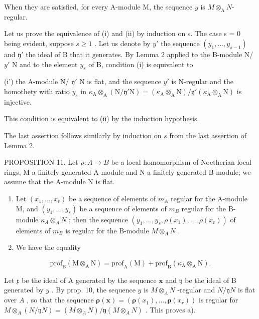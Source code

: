 When they are satisfied, for every A-module M, the sequence \(y\) is \(M\otimes_{\mathrm{A}}N\)-regular.

Let us prove the equivalence of (i) and (ii) by induction on s. The case s = 0 being evident, suppose \(s \geqslant 1\) . Let us denote by \(y'\) the sequence \((y_{1}, \ldots, y_{s-1})\) and \(\mathfrak{y}'\) the ideal of B that it generates. By Lemma 2 applied to the B-module N/ \(y'\) N and to the element \(y_{s}\) of B, condition (i) is equivalent to

(i') the A-module N/ \(\mathfrak{y}'\) N is flat, and the sequence \(y'\) is N-regular and the homothety with ratio \(y_s\) in \(\kappa_{\mathrm{A}} \otimes_{\mathrm{A}} (\mathrm{N}/\mathfrak{y}'\mathrm{N}) = (\kappa_{\mathrm{A}} \otimes_{\mathrm{A}} \mathrm{N})/\mathfrak{y}'(\kappa_{\mathrm{A}} \otimes_{\mathrm{A}} \mathrm{N})\) is injective.

This condition is equivalent to (ii) by the induction hypothesis.

The last assertion follows similarly by induction on \(s\) from the last assertion of Lemma 2.

PROPOSITION 11. Let \(\rho: A \to B\) be a local homomorphism of Noetherian local rings, M a finitely generated A-module and N a finitely generated B-module; we assume that the A-module N is flat.

\begin{enumerate}
\def\labelenumi{\alph{enumi})}
\item
  Let \((x_{1},\ldots,x_{r})\) be a sequence of elements of \(m_{A}\) regular for the A-module M, and \((y_{1},\ldots,y_{s})\) be a sequence of elements of \(m_{B}\) regular for the B-module \(\kappa_{A}\otimes_{A}N\) ; then the sequence \((y_{1},\ldots,y_{s},\rho(x_{1}),\ldots,\rho(x_{r}))\) of elements of \(m_{B}\) is regular for the B-module \(M\otimes_{A}N\) .
\item
  We have the equality
\end{enumerate}

\[
\mathrm{prof} _ {\mathrm{B}} (\mathrm{M} \otimes_ {\mathrm{A}} \mathrm{N}) = \mathrm{prof} _ {\mathrm{A}} (\mathrm{M}) + \mathrm{prof} _ {\mathrm{B}} (\kappa_ {\mathrm{A}} \otimes_ {\mathrm{A}} \mathrm{N}).
\]

Let \(\mathfrak{x}\) be the ideal of A generated by the sequence \(\mathbf{x}\) and \(\mathfrak{y}\) be the ideal of B generated by \(y\) . By prop. 10, the sequence \(y\) is \(M \otimes_A N\) -regular and \(N/\mathfrak{y}N\) is flat over \(A\) , so that the sequence \(\boldsymbol{\rho}(\mathbf{x}) = (\boldsymbol{\rho}(x_1), \ldots, \boldsymbol{\rho}(x_r))\) is regular for \(M \otimes_A (N/\mathfrak{y}N) = (M \otimes_A N)/\mathfrak{y}(M \otimes_A N)\) . This proves a).


